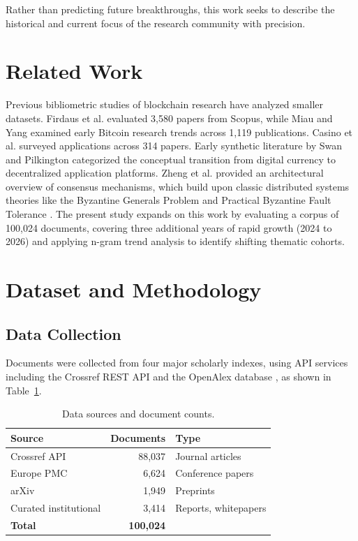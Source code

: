 \documentclass[11pt]{article}
\begin{document}
Rather than predicting future breakthroughs, this work seeks to describe the historical and current focus of the research community with precision.

\section{Related Work}
\label{sec:related}

Previous bibliometric studies of blockchain research have analyzed smaller datasets. Firdaus et al. \citep{firdaus2019root} evaluated 3,580 papers from Scopus, while Miau and Yang \citep{miau2018bibliometrics} examined early Bitcoin research trends across 1,119 publications. Casino et al. \citep{casino2019systematic} surveyed applications across 314 papers. Early synthetic literature by Swan \citep{swan2015blockchain} and Pilkington \citep{pilkington2016blockchain} categorized the conceptual transition from digital currency to decentralized application platforms. Zheng et al. \citep{zheng2017overview} provided an architectural overview of consensus mechanisms, which build upon classic distributed systems theories like the Byzantine Generals Problem \citep{lamport1982byzantine} and Practical Byzantine Fault Tolerance \citep{castro1999practical}. The present study expands on this work by evaluating a corpus of 100,024 documents, covering three additional years of rapid growth (2024 to 2026) and applying n-gram trend analysis to identify shifting thematic cohorts.

\section{Dataset and Methodology}
\label{sec:method}

\subsection{Data Collection}

Documents were collected from four major scholarly indexes, using API services including the Crossref REST API \citep{crossref2026api} and the OpenAlex database \citep{openalex2022open}, as shown in Table~\ref{tab:sources}.

\begin{table}[h]
\centering
\caption{Data sources and document counts.}
\label{tab:sources}
\begin{tabular}{lrl}
\toprule
Source & Documents & Type \\
\midrule
Crossref API & 88,037 & Journal articles \\
Europe PMC & 6,624 & Conference papers \\
arXiv & 1,949 & Preprints \\
Curated institutional & 3,414 & Reports, whitepapers \\
\midrule
\textbf{Total} & \textbf{100,024} & \\
\bottomrule
\end{tabular}
\end{table}
\end{document}
